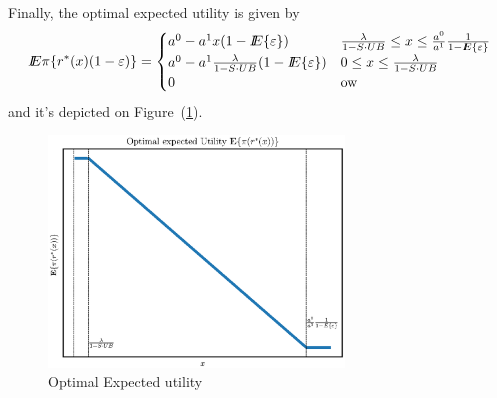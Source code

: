 Finally, the optimal expected utility is given by
\begin{equation}\label{eqEPOpt}
{I\kern-.35em E}\pi\{r^*(x)(1-\varepsilon)\}=\begin{cases}
a^0-a^1x(1-{I\kern-.35em E}\{\varepsilon\})&\frac{\lambda}{1-S\cdot UB}\leq x\leq \frac{a^0}{a^1}\frac{1}{1-{I\kern-.35em E}\{\varepsilon\}}\\
a^0-a^1\frac{\lambda}{1-S\cdot UB}(1-{I\kern-.35em E}\{\varepsilon\})&0\leq x\leq \frac{\lambda}{1-S\cdot UB}\\
0&{\rm ow}
\end{cases}
\end{equation}
and it's depicted on Figure~(\ref{figOpExUt}).

\begin{figure}[htbp] %
   \centering
   \includegraphics[width=0.7\textwidth]{OptExpUt} 
   \caption{Optimal Expected utility}
   \label{figOpExUt}
\end{figure}
